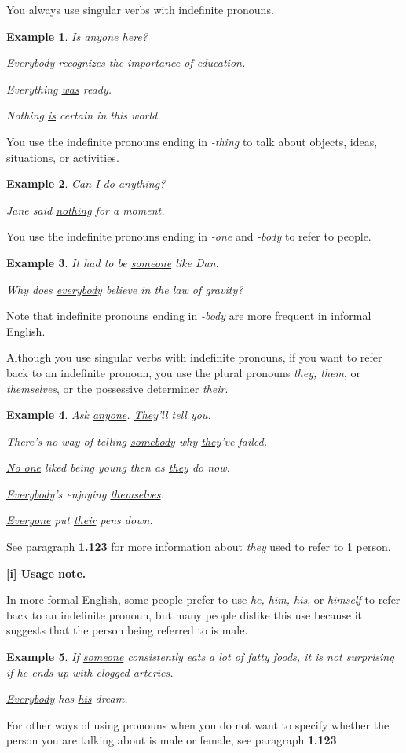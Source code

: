\documentclass[oneside]{book}
\numberwithin{equation}{section}
\newtheorem{example}{Example}[section]
\begin{document}
%
\noindent{} You always use singular verbs with indefinite pronouns.
\begin{example}
    \underline{Is} anyone here?
    
    Everybody \underline{recognizes} the importance of education.
    
    Everything \underline{was} ready.
    
    Nothing \underline{is} certain in this world.
\end{example}
%
\noindent{} You use the indefinite pronouns ending in \textit{-thing} to talk about objects, ideas, situations, or activities.
\begin{example}
    Can I do \underline{anything}?
    
    Jane said \underline{nothing} for a moment.
\end{example}
%
\noindent{} You use the indefinite pronouns ending in \textit{-one} and \textit{-body} to refer to people.
\begin{example}
    It had to be \underline{someone} like Dan.
    
    Why does \underline{everybody} believe in the law of gravity?
\end{example}
Note that indefinite pronouns ending in \textit{-body} are more frequent in informal English.

%
\noindent{} Although you use singular verbs with indefinite pronouns, if you want to refer back to an indefinite pronoun, you use the plural pronouns \textit{they, them}, or \textit{themselves}, or the possessive determiner \textit{their}.
\begin{example}
    Ask \underline{anyone}. \underline{They}'ll tell you.
    
    There's no way of telling \underline{somebody} why \underline{they}'ve failed.
    
    \underline{No one} liked being young then as \underline{they} do now.
    
    \underline{Everybody}'s enjoying \underline{themselves}.
    
    \underline{Everyone} put \underline{their} pens down.
\end{example}
See paragraph \textbf{1.123} for more information about \textit{they} used to refer to 1 person.

%
\textbf{[i] Usage note.}

%
\noindent{} In more formal English, some people prefer to use \textit{he, him, his}, or \textit{himself} to refer back to an indefinite pronoun, but many people dislike this use because it suggests that the person being referred to is male.
\begin{example}
    If \underline{someone} consistently eats a lot of fatty foods, it is not surprising if \underline{he} ends up with clogged arteries.
    
    \underline{Everybody} has \underline{his} dream.
\end{example}
For other ways of using pronouns when you do not want to specify whether the person you are talking about is male or female, see paragraph \textbf{1.123}.
\end{document}
